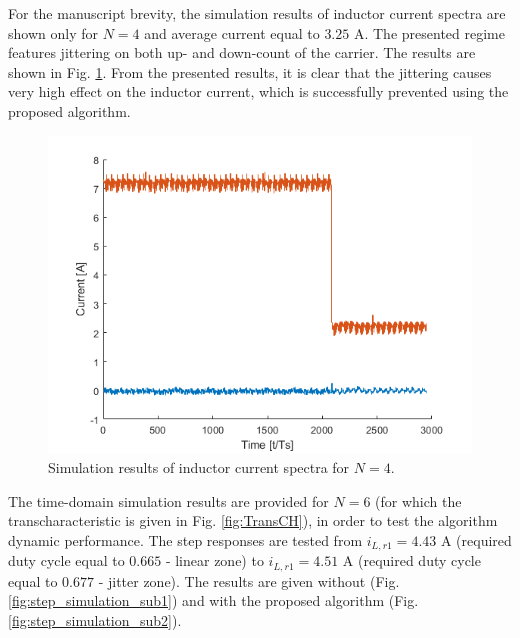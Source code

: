 \documentclass[journal]{IEEEtran}
\begin{document}
For the manuscript brevity, the simulation results of inductor current spectra are shown only for $N = 4$ and average current equal to $3.25$ A. The presented regime features jittering on both up- and down-count of the carrier. The results are shown in Fig. \ref{fig:N4Simulations}. From the presented results, it is clear that the jittering causes very high effect on the inductor current, which is successfully prevented using the proposed algorithm. 

\begin{figure}[t!]
    \centerline{\includegraphics[width=0.95\linewidth]{figures/nasb_step.png}}
    \caption{Simulation results of inductor current spectra for $N = 4$.}
    \label{fig:N4Simulations} 
\end{figure}

The time-domain simulation results are provided for $N=6$ (for which the transcharacteristic is given in Fig. \ref{fig:TransCH}), in order to test the algorithm dynamic performance.
The step responses are tested from $i_{L,r1} = 4.43$ A (required duty cycle equal to $0.665$ - linear zone) to $i_{L,r1} = 4.51$ A (required duty cycle equal to $0.677$ - jitter zone). The results are given without (Fig. \ref{fig:step_simulation_sub1}) and with the proposed algorithm (Fig. \ref{fig:step_simulation_sub2}).
\end{document}
